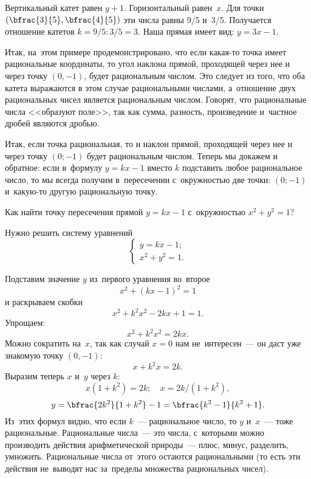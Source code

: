 Вертикальный катет равен $y+1$. Горизонтальный равен~$x$. Для точки $\left(\bfrac{3}{5}, \bfrac{4}{5}\right)$ эти числа равны 9/5 и~3/5.
Получается отношение катетов $k=9/5:3/5=3$. Наша прямая имеет вид: $y=3x-1$.

Итак, на~этом примере продемонстрировано, что если какая-то точка имеет рациональные координаты, то угол
наклона прямой, проходящей через нее и через точку $(0, -1)$, будет рациональным числом. Это следует из того, что оба
катета выражаются в этом случае рациональными числами,
а~отношение двух рациональных чисел является рациональным числом. Говорят, что рациональные числа
<<образуют поле>>, так как сумма, разность, произведение и~частное дробей являются дробью.

Итак, если точка рациональная, то и наклон прямой, проходящей через нее и через точку $(0; -1)$ будет
рациональным числом. Теперь мы докажем и обратное: если в~формулу $y=kx-1$ вместо $k$ подставить
любое рациональное число, то мы всегда получим в~пересечении с~окружностью две точки: $(0; -1)$
и~какую-то другую рациональную точку.



Как найти точку пересечения прямой $y=kx-1$ с~окружностью $x^{2}+y^{2}=1$?

Нужно решить систему уравнений
$$
\begin{cases}
y=kx-1;\\
x^{2}+y^{2}=1.
\end{cases}
$$

Подставим значение $y$ из~первого уравнения во~второе
$$
x^{2}+(kx-1)^{2}=1
$$
 и раскрываем скобки
$$
x^{2}+k^{2}x^{2}-2kx+1=1.
$$
Упрощаем:
$$
x^{2}+k^{2}x^{2}=2kx.
$$
Можно сократить на~$x$, так как случай $x=0$ нам не~интересен~--- он даст уже знакомую точку $(0, -1)$:
$$
x+k^{2}x=2k.
$$
Выразим теперь $x$ и~$y$ через $k$:
$$
x(1+k^{2})=2k;\quad
x=2k/(1+k^{2}),
$$
$$
y=\bfrac{2k^{2}}{1+k^{2}}-1=\bfrac{k^{2}-1}{k^{2}+1}.
$$
Из~этих формул видно, что если $k$~--- рациональное число, то $y$ и~$x$~--- тоже рациональные.
Рациональные числа~--- это числа, с~которыми можно производить действия арифметической природы~--- плюс, минус, разделить, умножить.
Рациональные числа от~этого остаются рациональными (то есть эти действия не~выводят нас за~пределы множества рациональных чисел).

